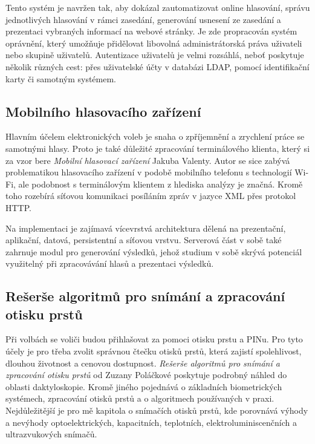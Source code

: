 \documentclass[11pt,twoside,a4paper]{book}
\begin{document}
Tento systém je navržen tak, aby dokázal zautomatizovat online hlasování, správu jednotlivých hlasování v rámci zasedání, generování usnesení ze zasedání a prezentaci vybraných informací na webové stránky. Je zde propracován systém oprávnění, který umožňuje přidělovat libovolná administrátorská práva uživateli nebo skupině uživatelů. Autentizace uživatelů je velmi rozsáhlá, neboť poskytuje několik různých cest: přes uživatelské účty v databázi LDAP, pomocí identifikační karty či samotným systémem. 

\subsection{Mobilního hlasovacího zařízení}

Hlavním účelem elektronických voleb je snaha o zpříjemnění a zrychlení práce se samotnými hlasy. Proto je také důležité zpracování terminálového klienta, který si za vzor bere \textit{Mobilní hlasovací zařízení} \cite{art:valenta} Jakuba Valenty. Autor se sice zabývá problematikou hlasovacího zařízení v podobě mobilního telefonu s technologií Wi-Fi, ale podobnost s terminálovým klientem z hlediska analýzy je značná. Kromě toho rozebírá síťovou komunikaci posíláním zpráv v jazyce XML přes protokol HTTP.

Na implementaci je zajímavá vícevrstvá architektura dělená na prezentační, aplikační, datová, persistentní a síťovou vrstvu. Serverová část v sobě také zahrnuje modul pro generování výsledků, jehož studium v sobě skrývá potenciál využitelný při zpracovávání hlasů a prezentaci výsledků.

\subsection{Rešerše algoritmů pro snímání a zpracování otisku prstů} \label{sec:reserse_otisky}

Při volbách se voliči budou přihlašovat za pomoci otisku prstu a PINu. Pro tyto účely je pro třeba zvolit správnou čtečku otisků prstů, která zajistí spolehlivost, dlouhou životnost a cenovou dostupnost. \textit{Rešerše algoritmů pro snímání a zpracování otisku prstů} \cite{art:polackova} od Zuzany Poláčkové poskytuje podrobný náhled do oblasti daktyloskopie. Kromě jiného pojednává o základních biometrických systémech, zpracování otisků prstů a o algoritmech používaných v praxi. Nejdůležitější je pro mě kapitola o snímačích otisků prstů, kde porovnává výhody a nevýhody optoelektrických, kapacitních, teplotních, elektroluminiscenčních a ultrazvukových snímačů.
\end{document}
